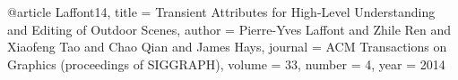 @article {Laffont14,
    title = {Transient Attributes for High-Level Understanding and Editing of Outdoor Scenes},
    author = {Pierre-Yves Laffont and Zhile Ren and Xiaofeng Tao and Chao Qian and James Hays},
    journal = {ACM Transactions on Graphics (proceedings of SIGGRAPH)},
    volume = {33},
    number = {4},
    year = {2014}
}
